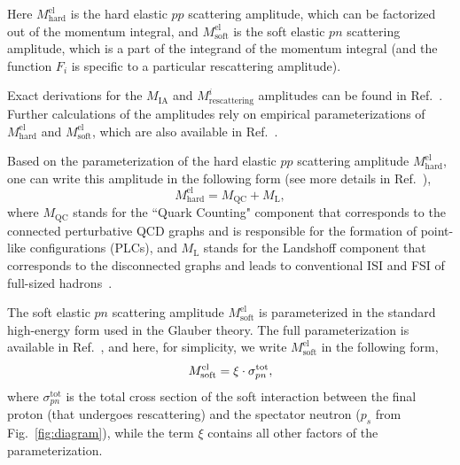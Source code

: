 Here $M_{\textrm{hard}}^{\textrm{el}}$ is the hard elastic $pp$ scattering amplitude, which can be factorized out of the momentum integral, and $M_{\textrm{soft}}^{\textrm{el}}$ is the soft elastic $pn$ scattering amplitude, which is a part of the integrand of the momentum integral (and the function $F_{i}$ is specific to a particular rescattering amplitude).



Exact derivations for the $M_{\textrm{IA}}$ and $M_{\textrm{rescattering}}^{i}$ amplitudes can be found in Ref.~\cite{PhysRevC.107.014605}. Further calculations of the amplitudes rely on empirical parameterizations of $M_{\textrm{hard}}^{\textrm{el}}$ and $M_{\textrm{soft}}^{\textrm{el}}$, which are also available in Ref.~\cite{PhysRevC.107.014605}.


Based on the parameterization of the hard elastic $pp$ scattering amplitude $M_{\textrm{hard}}^{\textrm{el}}$, one can write this amplitude in the following form (see more details in Ref.~\cite{PhysRevC.107.014605}),\vspace{-0.3em} 
 \begin{equation}
M_{\textrm{hard}}^{\textrm{el}} = M_{\textrm{QC}} + M_{\textrm{L}},\label{eq:qc_Landshoff}
\end{equation}
where $M_{\textrm{QC}}$ stands for the ``Quark Counting" component that corresponds to the connected perturbative QCD graphs and is responsible for the formation of point-like configurations (PLCs), and $M_{\textrm{L}}$ stands for the Landshoff component that corresponds to the disconnected graphs and leads to conventional ISI and FSI of full-sized hadrons~\cite{Ralston:1988rb}.




The soft elastic $pn$ scattering amplitude $M_{\textrm{soft}}^{\textrm{el}}$ is parameterized in the standard high-energy form used in the Glauber theory. The full parameterization is available in Ref.~\cite{PhysRevC.107.014605}, and here, for simplicity, we write $M_{\textrm{soft}}^{\textrm{el}}$ in the following form,
\begin{equation}
M_{\textrm{soft}}^{\textrm{el}} = \xi \cdot \sigma_{pn}^{\textrm{tot}},\\[-8pt]\label{eq:soft_par}
\end{equation}
where $\sigma_{pn}^{\textrm{tot}}$ is the total cross section of the soft interaction between the final proton (that undergoes rescattering) and the spectator neutron ($p_{s}$ from Fig.~\ref{fig:diagram}), while the term $\xi$ contains all other factors of the parameterization.



